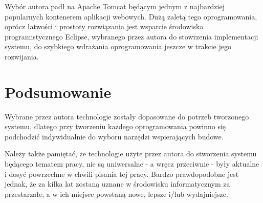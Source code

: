 Wybór autora padł na Apache Tomcat będącym jednym z najbardziej popularnych kontenerem aplikacji webowych. Dużą zaletą tego oprogramowania, oprócz łatwości i prostoty rozwiązania jest wsparcie środowiska programistycznego Eclipse, wybranego przez autora do stowrzenia implementacji systemu, do szybkiego wdrażania oprogramowania jeszcze w trakcie jego rozwijania. 
\section{Podsumowanie}
Wybrane przez autora technologie zostały dopasowane do potrzeb tworzonego systemu, dlatego przy tworzeniu każdego oprogramowania powinno się podchodzić indywidualnie do wyboru narzędzi wspierających budowe.

Należy także pamiętać, że technologie użyte przez autora do stworzenia systemu będącego tematem pracy, nie są uniwersalne - a wręcz przeciwnie - były aktualne i dosyć powrzechne w chwili pisania tej pracy. Bardzo prawdopodobne jest jednak, że za kilka lat zostaną uznane w środowisku informatycznym za przestarzałe, a w ich miejsce powstaną nowe, lepsze i/lub wydajniejsze.

